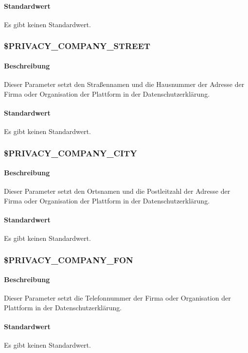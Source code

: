 \paragraph{Standardwert}Es gibt keinen Standardwert.

\subsubsection{\$PRIVACY\_COMPANY\_STREET} \label{config:privacy-comp-street}
\paragraph{Beschreibung}Dieser Parameter setzt den Straßennamen und die Hausnummer der Adresse der Firma oder Organisation der Plattform in der Datenschutzerklärung.
\paragraph{Standardwert}Es gibt keinen Standardwert.

\subsubsection{\$PRIVACY\_COMPANY\_CITY} \label{config:privacy-comp-city}
\paragraph{Beschreibung}Dieser Parameter setzt den Ortsnamen und die Postleitzahl der Adresse der Firma oder Organisation der Plattform in der Datenschutzerklärung.
\paragraph{Standardwert}Es gibt keinen Standardwert.

\subsubsection{\$PRIVACY\_COMPANY\_FON} \label{config:privacy-comp-fon}
\paragraph{Beschreibung}Dieser Parameter setzt die Telefonnummer der Firma oder Organisation der Plattform in der Datenschutzerklärung.
\paragraph{Standardwert}Es gibt keinen Standardwert.

